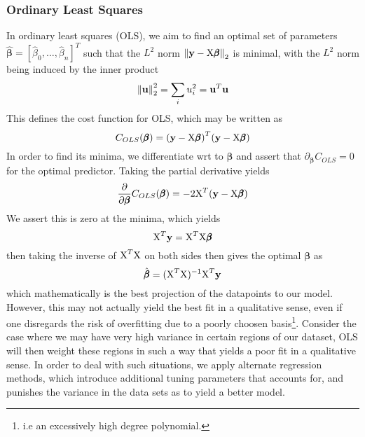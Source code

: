 \documentclass[reprint, english, nofootinbib]{revtex4-2}
\begin{document}
        \subsubsection{Ordinary Least Squares}
            \noindent
            In ordinary least squares (OLS), we aim to find an optimal set of parameters $\pmb{\hat\beta} = [\hat\beta_0, \dots, \hat\beta_n]^T$ such that the $L^2$ norm $\norm{\mathbf y - \textup{X}\pmb{\beta}}_2$ is minimal, with the $L^2$ norm being induced by the inner product
            \begin{equation}
                \norm{\mathbf u}_2^2 = \sum_i u_i^2 = \mathbf u^T \mathbf u
            \end{equation}
            This defines the cost function for OLS, which may be written as
            \begin{equation}
                C_{OLS}(\pmb \beta)
                = \qty(\mathbf y - \textup{X}\pmb \beta)^T(\mathbf y - \textup{X}\pmb \beta)
            \end{equation}
            In order to find its minima, we differentiate wrt to $\pmb\beta$ and assert that $\partial_{\pmb\beta}C_{OLS} = 0$ for the optimal predictor. Taking the partial derivative yields
            \begin{align}
                \begin{split}
                \pdv{\pmb\beta}C_{OLS}(\pmb\beta) = -2\textup{X}^T\qty(\mathbf y - \textup X\pmb \beta)
                \end{split}
            \end{align}
            We assert this is zero at the minima, which yields
            \begin{equation}
                \textup{X}^T\mathbf y = \textup{X}^T\textup{X}\pmb\beta
            \end{equation}
            then taking the inverse of $\textup{X}^T\textup{X}$ on both sides then gives the optimal $\pmb\beta$ as
            \begin{equation}
                \hat{\pmb \beta} = (\textup{X}^T\textup{X})^{-1}\textup{X}^T\mathbf y
            \end{equation}
            which mathematically is the best projection of the datapoints to our model. However, this may not actually yield the best fit in a qualitative sense, even if one disregards the risk of overfitting due to a poorly choosen basis\footnote{i.e an excessively high degree polynomial.}. Consider the case where we may have very high variance in certain regions of our dataset, OLS will then weight these regions in such a way that yields a poor fit in a qualitative sense. In order to deal with such situations, we apply alternate regression methods, which introduce additional tuning parameters that accounts for, and punishes the variance in the data sets as to yield a better model.
\end{document}

